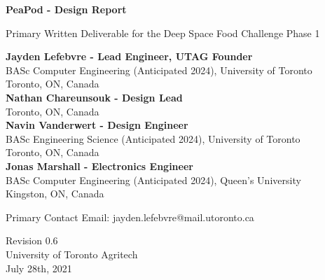 \documentclass{report}
\begin{document}
\begin{titlepage}
    \begin{center}
        \vspace*{1.2cm}

        \textbf{\large{PeaPod - Design Report}}

        \vspace{0.5cm}

        Primary Written Deliverable for the Deep Space Food Challenge Phase 1

        \vfill \small{

            \textbf{Jayden Lefebvre - Lead Engineer, UTAG Founder}\\
            BASc Computer Engineering (Anticipated 2024), University of Toronto\\
            Toronto, ON, Canada\\
            \vspace{.5cm}
            \textbf{Nathan Chareunsouk - Design Lead}\\Toronto, ON, Canada\\
            \vspace{.5cm}
            \textbf{Navin Vanderwert - Design Engineer}\\
            BASc Engineering Science (Anticipated 2024), University of Toronto\\
            Toronto, ON, Canada\\
            \vspace{.5cm}
            \textbf{Jonas Marshall - Electronics Engineer}\\
            BASc Computer Engineering (Anticipated 2024), Queen's University\\
            Kingston, ON, Canada

        }

        \vspace{1cm}

        Primary Contact Email: jayden.lefebvre@mail.utoronto.ca

        \vspace{.75cm}

        Revision 0.6\\
        University of Toronto Agritech\\
        July 28th, 2021

    \end{center}
\end{titlepage}

\thispagestyle{plain}
\end{document}
